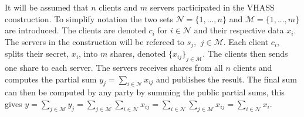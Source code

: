 It will be assumed that $n$ clients and $m$ servers participated in the VHASS construction. To simplify notation the two sets $\mathcal{N}=\{1,...,n\}$ and $\mathcal{M} = \{1,...,m\}$ are introduced. The clients are denoted $c_i$ for $i\in\mathcal{N}$ and their respective data $x_i$.  The servers in the construction will be refereed to $s_j$, $\:j\in\mathcal{M}$. Each client $c_i$, splits their secret, $x_i$, into $m$ shares, denoted $\{x_{ij}\}_{j\in\mathcal{M}}$. The clients then sends one share to each server. The servers receives shares from all $n$ clients and computes the partial sum $y_j = \sum_{i\in\mathcal{N}} x_{ij} $ and publishes the result. The final sum can then be computed by any party by summing the public partial sums, this gives $y = \sum_{j\in\mathcal{M}} y_j = \sum_{j\in\mathcal{M}} \sum_{i\in\mathcal{N}} x_{ij} = \sum_{i\in\mathcal{N}} \sum_{j\in\mathcal{M}} x_{ij} =   \sum_{i\in\mathcal{N}}x_i$.


